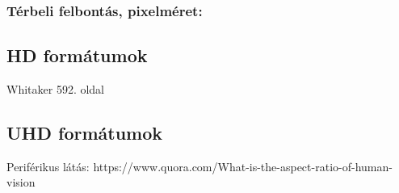 \subsubsection{Térbeli felbontás, pixelméret:}



\subsection{HD formátumok}

Whitaker 592. oldal

\subsection{UHD formátumok}

Periférikus látás:
https://www.quora.com/What-is-the-aspect-ratio-of-human-vision